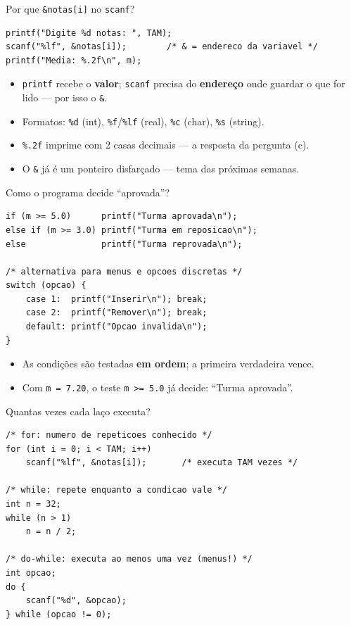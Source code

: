 \documentclass[aspectratio=169]{beamer}
\begin{document}
\begin{frame}[fragile]{Por que \texttt{\&notas[i]} no \texttt{scanf}?}
\begin{lstlisting}
printf("Digite %d notas: ", TAM);
scanf("%lf", &notas[i]);        /* & = endereco da variavel */
printf("Media: %.2f\n", m);
\end{lstlisting}
  \begin{itemize}
    \item \texttt{printf} recebe o \textbf{valor}; \texttt{scanf} precisa do
      \textbf{endereço} onde guardar o que for lido --- por isso o \texttt{\&}.
    \item Formatos: \texttt{\%d} (int), \texttt{\%f}/\texttt{\%lf} (real), \texttt{\%c} (char), \texttt{\%s} (string).
    \item \texttt{\%.2f} imprime com 2 casas decimais --- a resposta da pergunta (c).
    \item O \texttt{\&} já é um ponteiro disfarçado --- tema das próximas semanas.
  \end{itemize}
\end{frame}

\begin{frame}[fragile]{Como o programa decide ``aprovada''?}
\begin{lstlisting}
if (m >= 5.0)      printf("Turma aprovada\n");
else if (m >= 3.0) printf("Turma em reposicao\n");
else               printf("Turma reprovada\n");

/* alternativa para menus e opcoes discretas */
switch (opcao) {
    case 1:  printf("Inserir\n"); break;
    case 2:  printf("Remover\n"); break;
    default: printf("Opcao invalida\n");
}
\end{lstlisting}
  \begin{itemize}
    \item As condições são testadas \textbf{em ordem}; a primeira verdadeira vence.
    \item Com \texttt{m = 7.20}, o teste \texttt{m >= 5.0} já decide: ``Turma aprovada''.
  \end{itemize}
\end{frame}

\begin{frame}[fragile]{Quantas vezes cada laço executa?}
\begin{lstlisting}
/* for: numero de repeticoes conhecido */
for (int i = 0; i < TAM; i++)
    scanf("%lf", &notas[i]);       /* executa TAM vezes */

/* while: repete enquanto a condicao vale */
int n = 32;
while (n > 1)
    n = n / 2;

/* do-while: executa ao menos uma vez (menus!) */
int opcao;
do {
    scanf("%d", &opcao);
} while (opcao != 0);
\end{lstlisting}
\end{frame}
\end{document}
